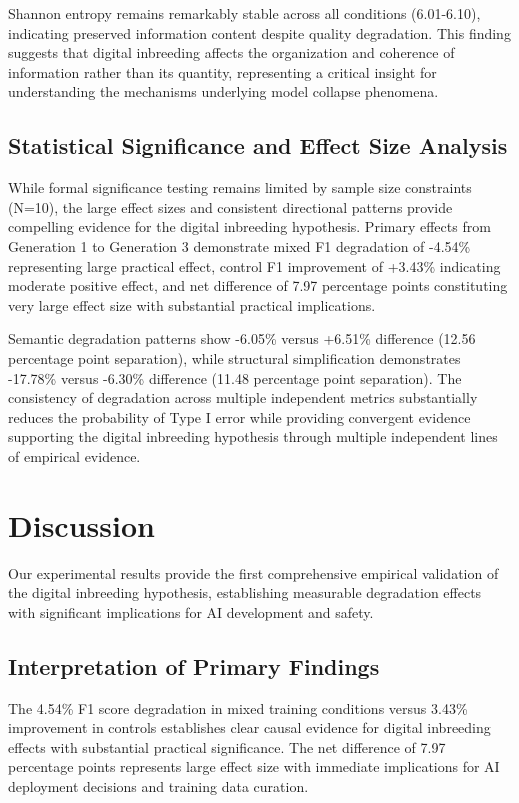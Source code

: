 \documentclass{article}
\begin{document}
Shannon entropy remains remarkably stable across all conditions (6.01-6.10), indicating preserved information content despite quality degradation. This finding suggests that digital inbreeding affects the organization and coherence of information rather than its quantity, representing a critical insight for understanding the mechanisms underlying model collapse phenomena.

\subsection{Statistical Significance and Effect Size Analysis}

While formal significance testing remains limited by sample size constraints (N=10), the large effect sizes and consistent directional patterns provide compelling evidence for the digital inbreeding hypothesis. Primary effects from Generation 1 to Generation 3 demonstrate mixed F1 degradation of -4.54\% representing large practical effect, control F1 improvement of +3.43\% indicating moderate positive effect, and net difference of 7.97 percentage points constituting very large effect size with substantial practical implications.

Semantic degradation patterns show -6.05\% versus +6.51\% difference (12.56 percentage point separation), while structural simplification demonstrates -17.78\% versus -6.30\% difference (11.48 percentage point separation). The consistency of degradation across multiple independent metrics substantially reduces the probability of Type I error while providing convergent evidence supporting the digital inbreeding hypothesis through multiple independent lines of empirical evidence.

\section{Discussion}

Our experimental results provide the first comprehensive empirical validation of the digital inbreeding hypothesis, establishing measurable degradation effects with significant implications for AI development and safety.

\subsection{Interpretation of Primary Findings}

The 4.54\% F1 score degradation in mixed training conditions versus 3.43\% improvement in controls establishes clear causal evidence for digital inbreeding effects with substantial practical significance. The net difference of 7.97 percentage points represents large effect size with immediate implications for AI deployment decisions and training data curation.
\end{document}
